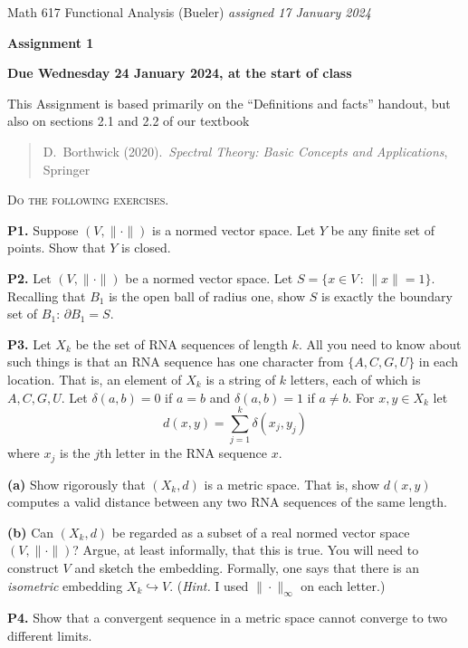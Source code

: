\documentclass[12pt]{amsart}
\newcommand{\prob}[1]{\bigskip\noindent\textbf{#1.}\quad }
\newcommand{\epart}[1]{\medskip\noindent\textbf{(#1)}\quad }
\begin{document}
\scriptsize \noindent Math 617 Functional Analysis (Bueler) \hfill \emph{assigned 17 January 2024}
\normalsize\medskip

\Large\centerline{\textbf{Assignment 1}}
\large
\medskip

\centerline{\textbf{Due Wednesday 24 January 2024, at the start of class}}
\medskip
\normalsize

\thispagestyle{empty}

\bigskip
\noindent This Assignment is based primarily on the ``Definitions and facts'' handout, but also on sections 2.1 and 2.2 of our textbook

\begin{quote}
D.~Borthwick (2020).~\emph{Spectral Theory: Basic Concepts and Applications}, Springer
\end{quote}

\medskip
\noindent \textsc{Do the following exercises.}
\smallskip


\prob{P1}  Suppose $(V,\|\cdot\|)$ is a normed vector space.  Let $Y$ be any finite set of points.  Show that $Y$ is closed.

\prob{P2}  Let $(V,\|\cdot\|)$ be a normed vector space.  Let $S=\{x\in V\,:\,\|x\|=1\}$.  Recalling that $B_1$ is the open ball of radius one, show $S$ is exactly the boundary set of $B_1$: $\partial B_1=S$.

\prob{P3}  Let $X_k$ be the set of RNA sequences of length $k$.  All you need to know about such things is that an RNA sequence has one character from $\{A,C,G,U\}$ in each location.  That is, an element of $X_k$ is a string of $k$ letters, each of which is $A,C,G,U$.  Let $\delta(a,b)=0$ if $a=b$ and $\delta(a,b)=1$ if $a\ne b$.  For $x,y \in X_k$ let
	$$d(x,y) = \sum_{j=1}^k \delta(x_j,y_j)$$
where $x_j$ is the $j$th letter in the RNA sequence $x$.

\epart{a}  Show rigorously that $(X_k,d)$ is a metric space.  That is, show $d(x,y)$ computes a valid distance between any two RNA sequences of the same length.

\epart{b}  Can $(X_k,d)$ be regarded as a subset of a real normed vector space $(V,\|\cdot\|)$?  Argue, at least informally, that this is true.  You will need to construct $V$ and sketch the embedding.  Formally, one says that there is an \emph{isometric} embedding $X_k \hookrightarrow V$.  (\emph{Hint.}  I used $\|\cdot\|_\infty$ on each letter.)

\prob{P4}  Show that a convergent sequence in a metric space cannot converge to two different limits.
\end{document}
